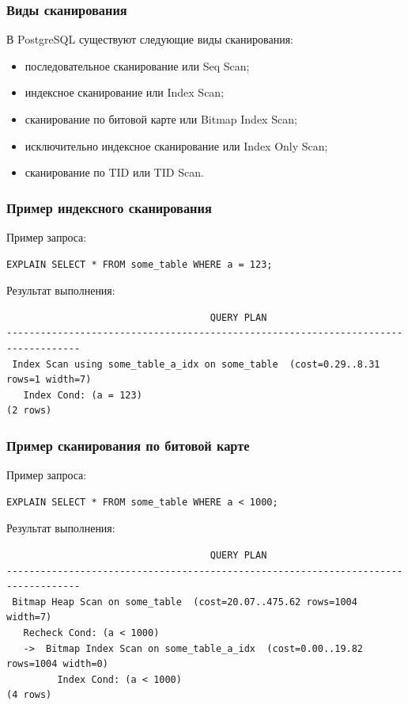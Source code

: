 \documentclass[aspectratio=169]{beamer}
\begin{document}
\begin{frame}
  \frametitle{Виды сканирования}

  В PostgreSQL существуют следующие виды сканирования:
  \begin{itemize}
    \item последовательное сканирование или Seq Scan;
    \item индексное сканирование или Index Scan;
    \item сканирование по битовой карте или Bitmap Index Scan;
    \item исключительно индексное сканирование или Index Only Scan;
    \item сканирование по TID или TID Scan.
  \end{itemize}
\end{frame}

\begin{frame}[fragile]
  \frametitle{Пример индексного сканирования}

  Пример запроса:
  \begin{verbatim}
EXPLAIN SELECT * FROM some_table WHERE a = 123;
  \end{verbatim}

  \vspace*{1em}

  Результат выполнения:
  \begin{verbatim}
                                    QUERY PLAN
-----------------------------------------------------------------------------------
 Index Scan using some_table_a_idx on some_table  (cost=0.29..8.31 rows=1 width=7)
   Index Cond: (a = 123)
(2 rows)
  \end{verbatim}
\end{frame}

\begin{frame}[fragile]
  \frametitle{Пример сканирования по битовой карте}

  Пример запроса:
  \begin{verbatim}
EXPLAIN SELECT * FROM some_table WHERE a < 1000;
  \end{verbatim}

  \vspace*{1em}

  Результат выполнения:
  \begin{verbatim}
                                    QUERY PLAN
-----------------------------------------------------------------------------------
 Bitmap Heap Scan on some_table  (cost=20.07..475.62 rows=1004 width=7)
   Recheck Cond: (a < 1000)
   ->  Bitmap Index Scan on some_table_a_idx  (cost=0.00..19.82 rows=1004 width=0)
         Index Cond: (a < 1000)
(4 rows)
  \end{verbatim}
\end{frame}
\end{document}

